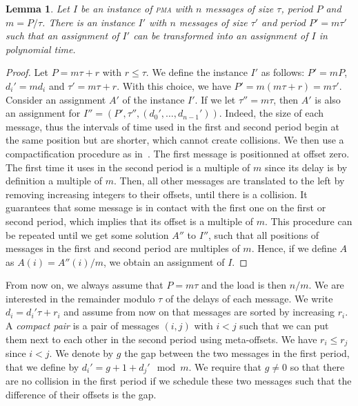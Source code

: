 \documentclass[10pt, conference, letterpaper]{IEEEtran}
\newtheorem{lemma}[theorem]{Lemma}
\newcommand\pma{\textsc{pma}\xspace}
\begin{document}
\begin{lemma}
Let $I$ be an instance of \pma with $n$ messages of size $\tau$, period $P$ and $m = P / \tau$. There is an instance $I'$ with $n$ messages of size $\tau'$ and period $P'= m\tau'$ such that an assignment of $I'$ can be transformed into an assignment of $I$ in polynomial time.
\end{lemma}
\begin{proof}
Let $P = m \tau + r$ with $r \leq \tau$. We define the instance $I'$ as follows: $P' = mP$, $d_{i}' = m d_i$ and $\tau' = m \tau + r$. With this choice, we have $P' = m(m \tau + r) = m \tau'$.
Consider an assignment $A'$ of the instance $I'$.
If we let $\tau'' = m\tau$, then $A'$ is also an assignment for $I'' = (P',\tau'',(d_{0}',\dots,d_{n-1}'))$. Indeed, the size of each message, thus the intervals of time used in the first and second period begin at the same position but are shorter, which cannot create collisions.
We then use a compactification procedure as in~\cite{barth2018deterministic}. The first message is positionned at offset zero. The first time it uses in the second period is a multiple of $m$ since its delay is by definition a multiple of $m$. Then, all other messages are translated to the left by removing increasing integers to their offsets, until there is a collision. It guarantees that some message is in contact with the first one on the first or second period,  which implies that its offset is a multiple of $m$. This procedure can be repeated until we get some solution $A''$ to $I''$, such that all positions of messages in the first and second period are multiples of $m$. Hence, if we define $A$ as $A(i) = A''(i)/m$, we obtain an assignment of $I$.
\end{proof}

From now on, we always assume that $P = m\tau$ and the load is then $n/m$.
We are interested in the remainder modulo $\tau$ of the delays of each message.
We write $d_i = d_{i}'\tau + r_i$ and assume from now on that messages are sorted by increasing $r_i$.
A \emph{compact pair} is a pair of messages $(i,j)$ with $i < j$ such that we can put them
next to each other in the second period using meta-offsets.
We have $r_i \leq r_j$ since $i < j$. We denote by $g$ the gap between the two messages in the first period, that we define by $d_{i}' = g + 1 + d_{j}' \mod m$. We require that $g \neq 0$ so that there are no collision in the first period if we schedule these two messages such that the difference of their offsets is the gap. 
\end{document}

